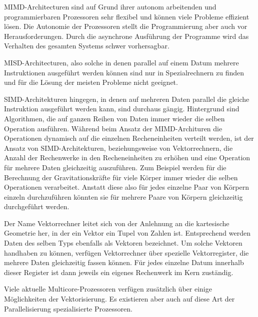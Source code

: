       MIMD-Architecturen sind auf Grund ihrer autonom arbeitenden und programmierbaren Prozessoren sehr flexibel und können viele Probleme effizient lösen. Die Autonomie der Prozessoren
      stellt die Programmierung aber auch vor Herausforderungen. Durch die asynchrone Ausführung der Programme wird das Verhalten des gesamten Systems schwer vorhersagbar.\citep{hpcskript}
      
      MISD-Architecturen, also solche in denen parallel auf einem Datum mehrere Instruktionen ausgeführt werden können sind nur in Spezialrechnern zu finden und für die Lösung der meisten
      Probleme nicht geeignet.
      
      SIMD-Architekturen hingegen, in denen auf mehreren Daten parallel die gleiche Instruktion ausgeführt werden kann, sind durchaus gängig.
      Hintergrund sind Algorithmen, die auf ganzen Reihen von Daten immer wieder die selben Operation ausführen. Während beim Ansatz der MIMD-Archituren die Operationen dynamisch auf die
      einzelnen Recheneinheiten verteilt werden, ist der Ansatz von SIMD-Architekturen, beziehungsweise von Vektorrechnern, die Anzahl der Rechenwerke in den Recheneinheiten zu erhöhen 
      und eine Operation für mehrere Daten gleichzeitig auszuführen. Zum Beispiel werden für die Berechnung der Gravitationskräfte für viele Körper immer wieder die selben Operationen 
      verarbeitet. Anstatt diese also für jedes einzelne Paar von Körpern einzeln durchzuführen könnten sie für mehrere Paare von Körpern gleichzeitig durchgeführt werden.
      
      Der Name Vektorrechner leitet sich von der Anlehnung an die kartesische Geometrie her, in der ein Vektor ein Tupel von Zahlen ist. Entsprechend werden Daten des selben Typs ebenfalls 
      als Vektoren bezeichnet. Um solche Vektoren handhaben zu können, verfügen Vektorrechner über spezielle Vektorregister, die mehrere Daten gleichzeitig fassen können. Für jedes einzelne
      Datum innerhalb dieser Register ist dann jeweils ein eigenes Rechenwerk im Kern zuständig.
      
      Viele aktuelle Multicore-Prozessoren verfügen zusätzlich über einige Möglichkeiten der Vektorisierung. Es existieren aber auch auf diese Art der Parallelisierung spezialisierte Prozessoren.
      

